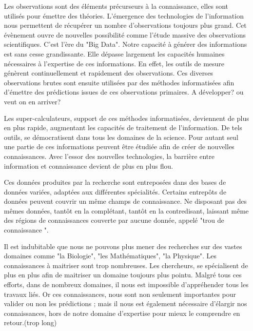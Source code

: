 Les observations sont des éléments précurseurs à la connaissance, elles sont utilisés pour émettre des théories. L'émergence des technologies de l'information nous permettent de récupérer un nombre d'observations toujours plus grand. Cet évènement ouvre de nouvelles possibilité comme l'étude massive des observations scientifiques. C'est l'ère du "Big Data". Notre capacité à générer des informations est sans cesse grandissante. Elle dépasse largement les capacités humaines nécessaires à l'expertise de ces informations. En effet, les outils de mesure génèrent continuellement et rapidement des observations. Ces diverses observations brutes sont ensuite utilisées par des méthodes informatisées afin d'émettre des prédictions issues de ces observations primaires. A développer? ou veut on en arriver?

Les super-calculateurs, support de ces méthodes informatisées, deviennent de plus en plus rapide, augmentant les capacités de traitement de l'information. De tels outils, se démocratisent dans tous les domaines de la science. Pour autant seul une partie de ces informations peuvent être étudiée afin de créer de nouvelles connaissances. Avec l'essor des nouvelles technologies, la barrière entre information et connaissance devient de plus en plus flou.


Ces données produites par la recherche sont entreposées dans des bases de données variées, adaptées aux différentes spécialités. Certains entrepôts de données peuvent couvrir un même champs de connaissance. Ne disposant pas des mêmes données, tantôt en la complétant, tantôt en la contredisant, laissant même des régions de connaissances couverte par aucune donnée, appelé "trou de connaissance ".

Il est indubitable que nous ne pouvons plus mener des recherches sur des vastes domaines comme "la Biologie", "les Mathématiques", "la Physique". Les connaissances à maitriser sont trop nombreuses. Les chercheurs, se spécialisent de plus en plus afin de maitriser un domaine toujours plus pointu. Malgré tous ces efforts, dans de nombreux domaines, il nous est impossible d'appréhender tous les travaux liés. Or ces connaissances, nous sont non seulement
importantes pour valider ou non les prédictions ; mais il nous est également nécessaire d'élargir nos connaissances, hors de notre domaine d'expertise pour mieux le comprendre en retour.(trop long)

